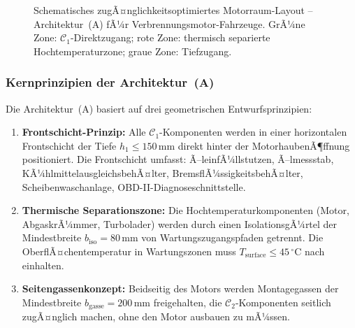 ﻿\documentclass[12pt,a4paper]{article}
\begin{document}
\begin{figure}[H]
	\caption{Schematisches zugÃ¤nglichkeitsoptimiertes Motorraum-Layout -- Architektur~(A)
		fÃ¼r Verbrennungsmotor-Fahrzeuge. GrÃ¼ne Zone: $\mathcal{C}_1$-Direktzugang;
		rote Zone: thermisch separierte Hochtemperaturzone; graue Zone: Tiefzugang.}
	\label{fig:layout_a}
\end{figure}

\subsubsection{Kernprinzipien der Architektur~(A)}

Die Architektur~(A) basiert auf drei geometrischen Entwurfsprinzipien:

\begin{enumerate}[leftmargin=*, label=(P\arabic*)]
	\item \textbf{Frontschicht-Prinzip:} Alle $\mathcal{C}_1$-Komponenten werden
	in einer horizontalen Frontschicht der Tiefe $h_1 \leq 150\,\mathrm{mm}$
	direkt hinter der MotorhaubenÃ¶ffnung positioniert. Die Frontschicht umfasst:
	Ã–leinfÃ¼llstutzen, Ã–lmessstab, KÃ¼hlmittelausgleichsbehÃ¤lter, BremsflÃ¼ssigkeitsbehÃ¤lter,
	Scheibenwaschanlage, OBD-II-Diagnoseschnittstelle.

	\item \textbf{Thermische Separationszone:} Die Hochtemperaturkomponenten
	(Motor, AbgaskrÃ¼mmer, Turbolader) werden durch einen IsolationsgÃ¼rtel der
	Mindestbreite $b_\mathrm{iso} = 80\,\mathrm{mm}$ von Wartungszugangspfaden
	getrennt. Die OberflÃ¤chentemperatur in Wartungszonen muss
	$T_\mathrm{surface} \leq 45\,^\circ\mathrm{C}$ nach \cite{EN13202} einhalten.

	\item \textbf{Seitengassenkonzept:} Beidseitig des Motors werden Montagegassen
	der Mindestbreite $b_\mathrm{gasse} = 200\,\mathrm{mm}$ freigehalten,
	die $\mathcal{C}_2$-Komponenten seitlich zugÃ¤nglich machen, ohne den
	Motor ausbauen zu mÃ¼ssen.
\end{enumerate}
\end{document}
